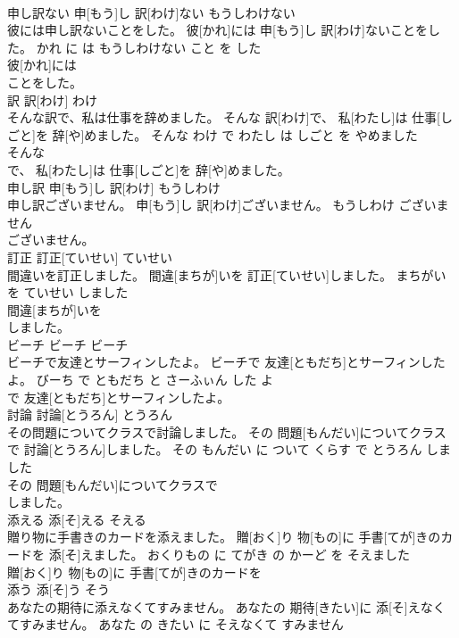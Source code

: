 \documentclass[8pt]{extreport}
\begin{document}
\begin{CJK}{UTF8}{min}
\\	申し訳ない	申[もう]し 訳[わけ]ない	もうしわけない	
\\	彼には申し訳ないことをした。	彼[かれ]には 申[もう]し 訳[わけ]ないことをした。	かれ に は もうしわけない こと を した	
\\	彼[かれ]には
\\	ことをした。			
\\	訳	訳[わけ]	わけ	
\\	そんな訳で、私は仕事を辞めました。	そんな 訳[わけ]で、 私[わたし]は 仕事[しごと]を 辞[や]めました。	そんな わけ で わたし は しごと を やめました	
\\	そんな
\\	で、 私[わたし]は 仕事[しごと]を 辞[や]めました。			
\\	申し訳	申[もう]し 訳[わけ]	もうしわけ	
\\	申し訳ございません。	申[もう]し 訳[わけ]ございません。	もうしわけ ございません	
\\	ございません。			
\\	訂正	訂正[ていせい]	ていせい	
\\	間違いを訂正しました。	間違[まちが]いを 訂正[ていせい]しました。	まちがい を ていせい しました	
\\	間違[まちが]いを
\\	しました。			
\\	ビーチ	ビーチ	ビーチ	
\\	ビーチで友達とサーフィンしたよ。	ビーチで 友達[ともだち]とサーフィンしたよ。	びーち で ともだち と さーふぃん した よ	
\\	で 友達[ともだち]とサーフィンしたよ。			
\\	討論	討論[とうろん]	とうろん	
\\	その問題についてクラスで討論しました。	その 問題[もんだい]についてクラスで 討論[とうろん]しました。	その もんだい に ついて くらす で とうろん しました	
\\	その 問題[もんだい]についてクラスで
\\	しました。			
\\	添える	添[そ]える	そえる	
\\	贈り物に手書きのカードを添えました。	贈[おく]り 物[もの]に 手書[てが]きのカードを 添[そ]えました。	おくりもの に てがき の かーど を そえました	
\\	贈[おく]り 物[もの]に 手書[てが]きのカードを
\\	添う	添[そ]う	そう	
\\	あなたの期待に添えなくてすみません。	あなたの 期待[きたい]に 添[そ]えなくてすみません。	あなた の きたい に そえなくて すみません	

\end{CJK}
\end{document}
